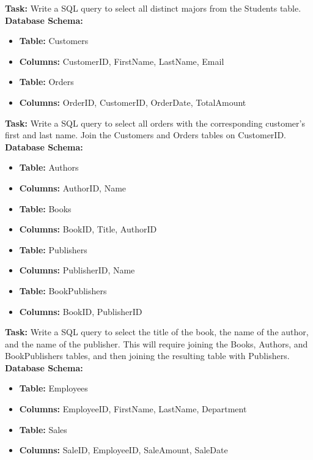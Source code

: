 \noindent \textbf{Task:} Write a SQL query to select all distinct majors from the Students table.\\

\noindent \textbf{Database Schema:} 
\begin{itemize}
    \item \textbf{Table:} Customers
    \item \textbf{Columns:} CustomerID, FirstName, LastName, Email
    \item \textbf{Table:} Orders
    \item \textbf{Columns:} OrderID, CustomerID, OrderDate, TotalAmount
\end{itemize}

\noindent \textbf{Task:} Write a SQL query to select all orders with the corresponding customer's first and last name. Join the Customers and Orders tables on CustomerID.\\

\noindent \textbf{Database Schema:}
\begin{itemize}
    \item \textbf{Table:} Authors
    \item \textbf{Columns:} AuthorID, Name
    \item \textbf{Table:} Books
    \item \textbf{Columns:} BookID, Title, AuthorID
    \item \textbf{Table:} Publishers
    \item \textbf{Columns:} PublisherID, Name
    \item \textbf{Table:} BookPublishers
    \item \textbf{Columns:} BookID, PublisherID
\end{itemize}

\noindent \textbf{Task:} Write a SQL query to select the title of the book, the name of the author, and the name of the publisher. This will require joining the Books, Authors, and BookPublishers tables, and then joining the resulting table with Publishers.\\

\noindent \textbf{Database Schema:}
\begin{itemize}
    \item \textbf{Table:} Employees
    \item \textbf{Columns:} EmployeeID, FirstName, LastName, Department
    \item \textbf{Table:} Sales
    \item \textbf{Columns:} SaleID, EmployeeID, SaleAmount, SaleDate
\end{itemize}

